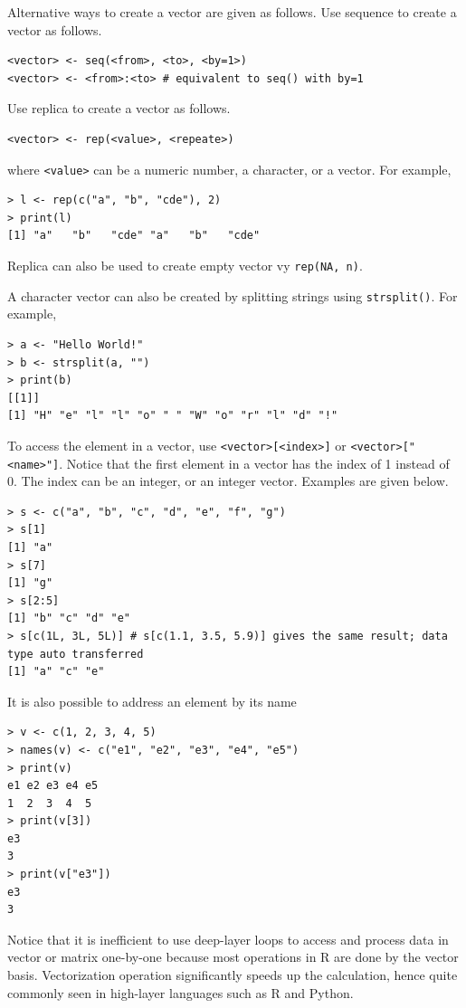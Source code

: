 Alternative ways to create a vector are given as follows. Use sequence to create a vector as follows.
\begin{lstlisting}
<vector> <- seq(<from>, <to>, <by=1>)
<vector> <- <from>:<to> # equivalent to seq() with by=1
\end{lstlisting}

Use replica to create a vector as follows.
\begin{lstlisting}
<vector> <- rep(<value>, <repeate>)
\end{lstlisting}
where \verb|<value>| can be a numeric number, a character, or a vector. For example,
\begin{lstlisting}
> l <- rep(c("a", "b", "cde"), 2)
> print(l)
[1] "a"   "b"   "cde" "a"   "b"   "cde"
\end{lstlisting}
Replica can also be used to create empty vector vy \verb|rep(NA, n)|.

A character vector can also be created by splitting strings using \verb|strsplit()|. For example,
\begin{lstlisting}
> a <- "Hello World!"
> b <- strsplit(a, "")
> print(b)
[[1]]
[1] "H" "e" "l" "l" "o" " " "W" "o" "r" "l" "d" "!"
\end{lstlisting}

To access the element in a vector, use \verb|<vector>[<index>]| or \verb|<vector>["<name>"]|. Notice that the first element in a vector has the index of 1 instead of 0. The index can be an integer, or an integer vector. Examples are given below.
\begin{lstlisting}
> s <- c("a", "b", "c", "d", "e", "f", "g")
> s[1]
[1] "a"
> s[7]
[1] "g"
> s[2:5]
[1] "b" "c" "d" "e"
> s[c(1L, 3L, 5L)] # s[c(1.1, 3.5, 5.9)] gives the same result; data type auto transferred
[1] "a" "c" "e"
\end{lstlisting}
It is also possible to address an element by its name
\begin{lstlisting}
> v <- c(1, 2, 3, 4, 5)
> names(v) <- c("e1", "e2", "e3", "e4", "e5") 	
> print(v)
e1 e2 e3 e4 e5
1  2  3  4  5
> print(v[3])
e3
3
> print(v["e3"])
e3
3
\end{lstlisting}

Notice that it is inefficient to use deep-layer loops to access and process data in vector or matrix one-by-one because most operations in R are done by the vector basis. Vectorization operation significantly speeds up the calculation, hence quite commonly seen in high-layer languages such as R and Python.

